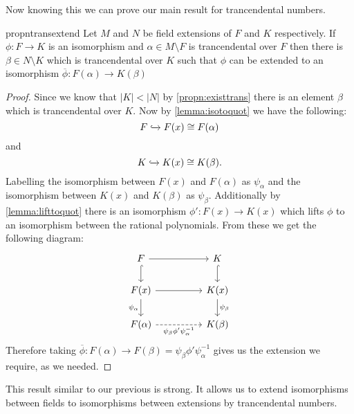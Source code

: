 Now knowing this we can prove our main result for trancendental numbers.

\begin{restatable}{propn}{transextend}
  Let $M$ and $N$ be field extensions of $F$ and $K$ respectively.
  If $\phi: F \to K$ is an isomorphism and $\alpha \in M \setminus F$ 
  is trancendental over $F$ then there is $\beta \in N \setminus K$ which is
  trancendental over $K$ such that $\phi$ can be extended to an isomorphism 
  $\overline{\phi}: F(\alpha) \to K(\beta)$
\end{restatable}
\begin{proof}
  Since we know that $|K| < |N|$ by \cref{propn:existtrans} there is an
  element $\beta$ which is trancendental over $K$. Now by
  \cref{lemma:isotoquot} we have the following:
  \[
    F \xhookrightarrow{} F(x) \cong F(\alpha)
  \] 
  and
  \[
    K \xhookrightarrow{} K(x) \cong K(\beta)
  .\] 
  Labelling the isomorphism between $F(x)$ and $F(\alpha)$ as $\psi_{\alpha}$ 
  and the isomorphism between $K(x)$ and $K(\beta)$ as $\psi_{\beta}$.
  Additionally by \cref{lemma:lifttoquot} there is an isomorphism $\phi':
  F(x) \to K(x)$ which lifts $\phi$ to an isomorphism between the rational
  polynomials. From these we get the following diagram:
  \begin{equation}
  \begin{tikzcd}
    F  \arrow[rr] \arrow[d, hook] & & K \arrow[d, hook] \\
    F(x) \arrow[rr] \arrow[d, "\psi_{\alpha}"']& & K(x) 
                                        \arrow[d, "\psi_{\beta}"]
    \\
    F(\alpha) \arrow[rr, dashed, "\psi_{\beta}\phi'\psi_{\alpha}^{-1}"'] 
                                              & & K(\beta)
  \end{tikzcd}
  \end{equation}
  Therefore taking $\overline{\phi}: F(\alpha) \to F(\beta)
  = \psi_{\beta}\phi'\psi_{\alpha}^{-1}$ gives us the extension we require, as
  we needed.
\end{proof}

This result similar to our previous is strong. It allows us to extend
isomorphisms between fields to isomorphisms between extensions by trancendental
numbers. 
